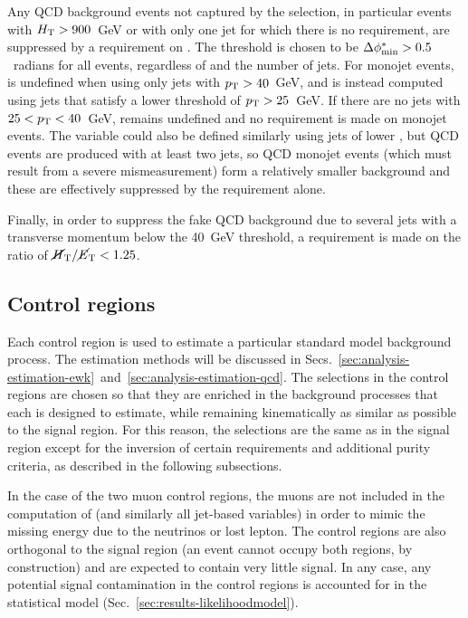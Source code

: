 Any QCD background events not captured by the \alphat selection, in particular 
events with $\mbox{$H_\text{T}$}>900$~GeV or with only one jet for which there is no 
\alphat requirement, are suppressed by a requirement on \bdphi. The threshold 
is chosen to be $\mbox{$\Delta\phi^{*}_{\mathrm{min}}$}>0.5$~radians for all events, regardless of \scalht and 
the 
number of jets. For monojet events, \bdphi is undefined when using only jets 
with ${p_{\text T}}>40$~GeV, and is instead computed using jets that satisfy a lower 
threshold of ${p_{\text T}}>25$~GeV. If there are no jets with $25<{p_{\text T}}<40$~GeV, \bdphi 
remains undefined and no requirement is made on monojet events. The \alphat 
variable could also be defined similarly using jets of lower \pt, but QCD 
events are produced with at least two jets, so QCD monojet events (which must 
result from a severe mismeasurement) form a relatively smaller background and 
these are effectively suppressed by the \bdphi requirement alone.

Finally, in order to suppress the fake \met QCD background due to several jets 
with a transverse momentum below the 40~GeV threshold, a requirement is made on 
the \mhtmet ratio of $\mbox{$\mbox{$\cancel{H}_\text{T}$} / \mbox{$\cancel{E}_\text{T}$}$} < 1.25$.

\subsection{Control regions}
\label{sec:analysis-eventselection-cr}
Each control region is used to estimate a particular standard model background 
process. The estimation methods will be discussed in 
Secs.~\ref{sec:analysis-estimation-ewk}~and~\ref{sec:analysis-estimation-qcd}.
The selections in the control regions are chosen so that they are enriched in 
the background processes that each is designed to estimate, while remaining 
kinematically as similar as possible to the signal region. 
For this reason, the 
selections are the same as in the signal region except for the inversion of 
certain requirements and additional purity criteria, as described in the 
following subsections.

In the case of the two muon control regions, the muons are not included in the 
computation of \met (and similarly all jet-based variables) in order to mimic 
the missing energy due to the neutrinos or lost lepton.
The control regions are also orthogonal to the signal 
region (an event cannot occupy both regions, by construction) and are expected 
to contain very little signal. In any case, any potential signal contamination 
in the control regions is accounted for in the statistical model 
(Sec.~\ref{sec:results-likelihoodmodel}).


